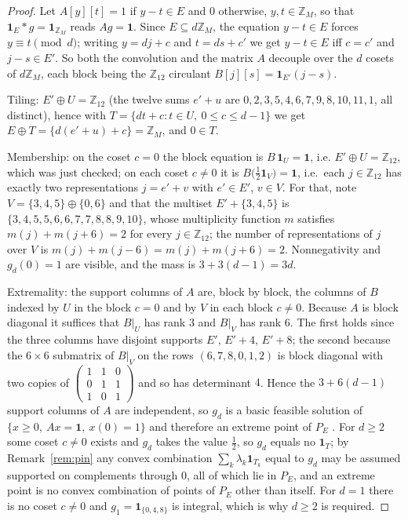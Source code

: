 \documentclass[11pt]{amsart}
\theoremstyle{definition}
\theoremstyle{remark}
\newcommand{\ZM}{\mathbb Z_M}
\newcommand{\Zn}[1]{\mathbb Z_{#1}}
\newcommand{\one}{\mathbf 1}
\begin{document}
\begin{proof}
Let $A[y][t]=1$ if $y-t\in E$ and $0$ otherwise, $y,t\in\ZM$, so that
$\one_E*g=\one_{\ZM}$ reads $Ag=\one$.
Since $E\subseteq d\ZM$, the equation $y-t\in E$ forces $y\equiv t\pmod d$;
writing $y=dj+c$ and $t=ds+c'$ we get $y-t\in E$ iff $c=c'$ and
$j-s\in E'$. So both the convolution and the matrix $A$ decouple over the $d$
cosets of $d\ZM$, each block being the $\Zn{12}$ circulant
$B[j][s]=\one_{E'}(j-s)$.

Tiling: $E'\oplus U=\Zn{12}$ (the twelve sums $e'+u$ are
$0,2,3,5,4,6,7,9,8,10,11,1$, all distinct), hence with
$T=\{dt+c : t\in U,\ 0\le c\le d-1\}$ we get
$E\oplus T=\{d(e'+u)+c\}=\ZM$, and $0\in T$.

Membership: on the coset $c=0$ the block equation is $B\,\one_U=\one$, i.e.
$E'\oplus U=\Zn{12}$, which was just checked; on each coset $c\ne0$ it is
$B\bigl(\tfrac12\one_V\bigr)=\one$, i.e.\ each $j\in\Zn{12}$ has exactly two
representations $j=e'+v$ with $e'\in E'$, $v\in V$. For that, note
$V=\{3,4,5\}\oplus\{0,6\}$ and that the multiset $E'+\{3,4,5\}$ is
$\{3,4,5,5,6,6,7,7,8,8,9,10\}$, whose multiplicity function $m$ satisfies
$m(j)+m(j+6)=2$ for every $j\in\Zn{12}$; the number of representations of $j$
over $V$ is $m(j)+m(j-6)=m(j)+m(j+6)=2$. Nonnegativity and $g_d(0)=1$
are visible, and the mass is $3+3(d-1)=3d$.

Extremality: the support columns of $A$ are, block by block, the columns of $B$
indexed by $U$ in the block $c=0$ and by $V$ in each block $c\ne0$. Because $A$
is block diagonal it suffices that $B|_U$ has rank $3$ and $B|_V$ has rank $6$.
The first holds since the three columns have disjoint supports
$E'$, $E'+4$, $E'+8$; the second because the $6\times6$ submatrix of $B|_V$ on
the rows $(6,7,8,0,1,2)$ is block diagonal with two copies of
$\begin{pmatrix}1&1&0\\0&1&1\\1&0&1\end{pmatrix}$ and so has determinant $4$.
Hence the $3+6(d-1)$ support columns of $A$ are independent, so $g_d$ is a basic
feasible solution of $\{x\ge0,\ Ax=\one,\ x(0)=1\}$ and therefore an extreme
point of $P_E$ \cite[\S8.5]{Schrijver}. For $d\ge2$ some coset $c\ne0$ exists
and $g_d$ takes the value $\tfrac12$, so $g_d$ equals no $\one_T$; by
Remark~\ref{rem:pin} any convex combination $\sum_k\lambda_k\one_{T_k}$ equal to
$g_d$ may be assumed supported on complements through $0$, all of which lie in
$P_E$, and an extreme point is no convex combination of points of $P_E$ other
than itself.
For $d=1$ there is no coset $c\ne0$ and $g_1=\one_{\{0,4,8\}}$ is integral,
which is why $d\ge2$ is required.
\end{proof}
\end{document}
